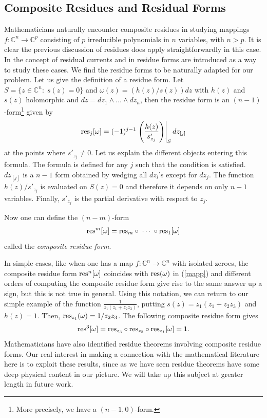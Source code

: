 \documentclass[12pt]{article}
\newcommand{\be}{\begin{eqnarray}}
\newcommand{\ee}{\end{eqnarray}}
\begin{document}
\subsection{Composite Residues and Residual Forms}

Mathematicians naturally encounter composite residues in studying mappings $f:\mathbb{C}^n\to \mathbb{C}^p$ consisting of $p$ irreducible polynomials in $n$ variables, with $n>p$.  It is clear the previous discussion of residues does apply straightforwardly in this case. In \cite{Tsikh} the concept of residual currents and in \cite{Yuzhakov} residue forms are introduced as a way to study these cases. We find the residue forms to be naturally adapted for our problem. Let us give the definition of a residue form. Let $S=\{z\in\mathbb{C}^n:\; s(z)=0\}$ and $\omega(z)=(h(z)/s(z))dz$ with $h(z)$ and $s(z)$ holomorphic and $dz=dz_1\wedge\ldots \wedge dz_n$, then the residue form is an $(n-1)$-form\footnote{More precisely, we have a $(n-1,0)$-form.} given by
%
\be
{\rm res}_j[\omega] = (-1)^{j-1}\left.\left(\frac{h(z)}{s'_{z_j}}\right)\right|_{S}dz_{[j]}
\ee
%
at the points where $s'_{z_j}\neq 0$. Let us explain the different objects entering this formula. The formula is defined for any $j$ such that the condition is satisfied. $dz_{[j]}$ is a $n-1$ form obtained by wedging all $dz_i$'s except for $dz_{j}$. The function $h(z)/s'_{z_j}$ is evaluated on $S(z)=0$ and therefore it depends on only $n-1$ variables. Finally, $s'_{z_j}$ is the partial derivative with respect to $z_j$.

Now one can define the $(n-m)$-form
%
\be
{\rm res}^m[\omega] = {\rm res}_m \circ \;\cdots\; \circ {\rm res}_1[\omega]
\ee
%
called the {\it composite residue form}.

In simple cases, like when one has a map $f:\mathbb{C}^n\to \mathbb{C}^n$ with isolated zeroes, the composite residue form ${\rm res}^n[\omega]$ coincides with ${\rm res}(\omega)$ in (\ref{mapp}) and different orders of computing the composite residue form give rise to the same answer up a sign, but this is not true in general. Using this notation, we can return to our simple example of the function $\frac{1}{z_1 (z_1 + z_2 z_3)}$, putting  $s(z) = z_1
(z_1+z_2z_3)$ and $h(z)=1$. Then, ${\rm res}_{z_1}(\omega) = 1/z_2z_3$. The following composite residue form gives
%
\be
{\rm res}^3[\omega] = {\rm res}_{z_3} \circ {\rm res}_{z_2} \circ {\rm res}_{z_1} [\omega] = 1.
\ee
%
Mathematicians have also identified residue theorems involving composite residue forms. Our real interest in making a connection with the mathematical literature here is to exploit these results, since as we have seen residue theorems have some deep physical content in our picture. We will take up this subject at greater length in future work.
\end{document}
